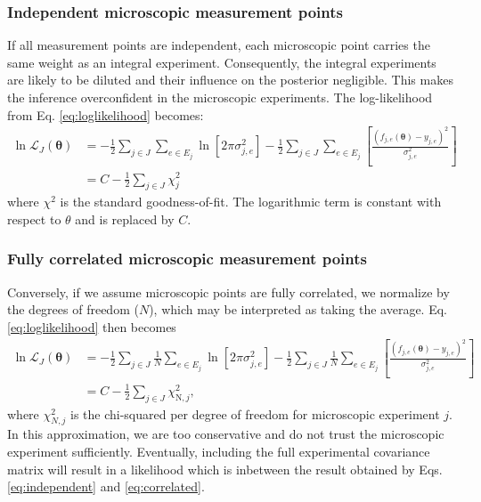 \documentclass[preprint,review,12pt]{elsarticle}
\begin{document}
\subsubsection{Independent microscopic measurement points}
If all measurement points are independent, each microscopic point carries the same weight as an integral experiment. Consequently, the integral experiments are likely to be diluted and their influence on the posterior negligible. This makes the inference overconfident in the microscopic experiments. The log-likelihood from Eq. \ref{eq:loglikelihood} becomes:
\begin{equation}\label{eq:independent}
    \begin{split}
        \ln\mathcal{L}_J (\mathbf{\theta}) &= -\frac{1}{2} \sum_{j\in J}\sum_{e\in E_j} \ln\left[2\pi\sigma_{j,e}^2\right] - \frac{1}{2}\sum_{j\in J}\sum_{e\in E_j}\left[\frac{(f_{j,e}(\mathbf{\theta})-y_{j,e})^2}{\sigma_{j,e}^2}\right] \\
        &= C -\frac{1}{2}\sum_{j\in J}\chi^2_j
    \end{split}
\end{equation}
where $\chi^2$ is the standard goodness-of-fit. The logarithmic term is constant with respect to $\theta$ and is replaced by $C$.

\subsubsection{Fully correlated microscopic measurement points}
Conversely, if we assume microscopic points are fully correlated, we normalize by the degrees of freedom ($N$), which may be interpreted as taking the average. Eq. \ref{eq:loglikelihood} then becomes
\begin{equation}\label{eq:correlated}
    \begin{split}
        \ln\mathcal{L}_J (\mathbf{\theta}) &= -\frac{1}{2} \sum_{j\in J}\frac{1}{N}\sum_{e\in E_j} \ln\left[2\pi\sigma_{j,e}^2\right] - \frac{1}{2}\sum_{j\in J}\frac{1}{N}\sum_{e\in E_j}\left[\frac{(f_{j,e}(\mathbf{\theta})-y_{j,e})^2}{\sigma_{j,e}^2}\right] \\
        &= C -\frac{1}{2}\sum_{j\in J}\chi^2_{\text{N},j},
    \end{split}
\end{equation}
where $\chi_{N,j}^2$ is the chi-squared per degree of freedom for microscopic experiment $j$. In this approximation, we are too conservative and do not trust the microscopic experiment sufficiently. Eventually, including the full experimental covariance matrix will result in a likelihood which is inbetween the result obtained by Eqs. \ref{eq:independent} and \ref{eq:correlated}. 
\end{document}
